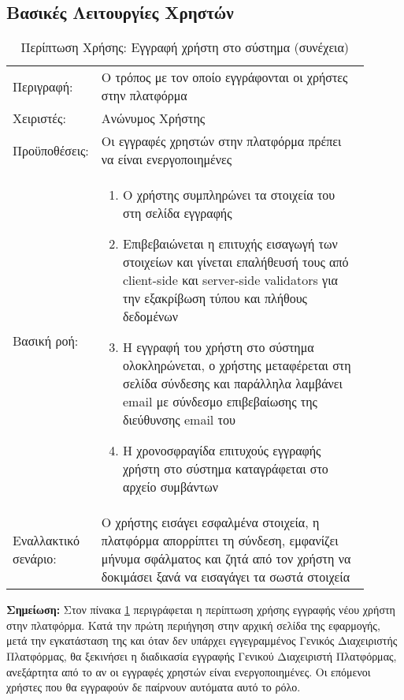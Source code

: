 \subsection{Βασικές Λειτουργίες Χρηστών}

%
%
\begin{longtable}{|p{0.14\linewidth}|p{0.76\linewidth}|}
	\caption{Περίπτωση Χρήσης: Εγγραφή χρήστη στο σύστημα} \label{tab:use-case-signup} \\ \hline \endfirsthead
	\caption[{}]{Περίπτωση Χρήσης: Εγγραφή χρήστη στο σύστημα (συνέχεια)} \\ \endhead \endfoot
	Περιγραφή: & Ο τρόπος με τον οποίο εγγράφονται οι χρήστες στην πλατφόρμα \\ \hline
	Χειριστές: & Ανώνυμος Χρήστης \\ \hline
	Προϋποθέσεις: & Οι εγγραφές χρηστών στην πλατφόρμα πρέπει να είναι ενεργοποιημένες \\ \hline
	Βασική ροή: &
	\begin{enumerate}
		\vspace{-1cm}
		\addtolength{\itemindent}{-0.4cm}
		\item Ο χρήστης συμπληρώνει τα στοιχεία του στη σελίδα εγγραφής
		\item Επιβεβαιώνεται η επιτυχής εισαγωγή των στοιχείων και γίνεται επαλήθευσή τους από client-side και server-side validators για την εξακρίβωση τύπου και πλήθους δεδομένων
		\item Η εγγραφή του χρήστη στο σύστημα ολοκληρώνεται, ο χρήστης μεταφέρεται στη σελίδα σύνδεσης και παράλληλα λαμβάνει email με σύνδεσμο επιβεβαίωσης της διεύθυνσης email του
		\item Η χρονοσφραγίδα επιτυχούς εγγραφής χρήστη στο σύστημα καταγράφεται στο αρχείο συμβάντων
		\vspace{-0.7cm}
	\end{enumerate} \\ \hline
	Εναλλακτικό σενάριο: & O χρήστης εισάγει εσφαλμένα στοιχεία, η πλατφόρμα απορρίπτει τη σύνδεση, εμφανίζει μήνυμα σφάλματος και ζητά από τον χρήστη να δοκιμάσει ξανά να εισαγάγει τα σωστά στοιχεία \\ \hline
\end{longtable}

\textbf{Σημείωση:} Στον πίνακα \ref{tab:use-case-signup} περιγράφεται η περίπτωση χρήσης εγγραφής νέου χρήστη στην πλατφόρμα. Κατά την πρώτη περιήγηση στην αρχική σελίδα της εφαρμογής, μετά την εγκατάσταση της και όταν δεν υπάρχει εγγεγραμμένος Γενικός Διαχειριστής Πλατφόρμας, θα ξεκινήσει η διαδικασία εγγραφής Γενικού Διαχειριστή Πλατφόρμας, ανεξάρτητα από το αν οι εγγραφές χρηστών είναι ενεργοποιημένες. Οι επόμενοι χρήστες που θα εγγραφούν δε παίρνουν αυτόματα αυτό το ρόλο.

